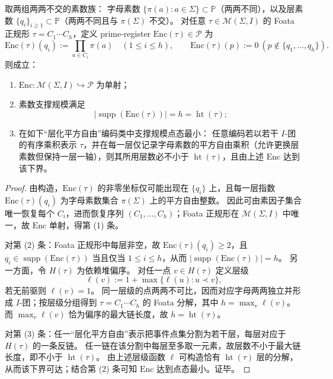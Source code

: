 \begin{theorem}\label{thm:conclusion-foata-godel-layer-encoding-min-support}
取两组两两不交的素数族：
字母素数 \(\{\pi(a):a\in\Sigma\}\subset\mathbb P\)（两两不同），以及层素数 \(\{q_i\}_{i\ge 1}\subset\mathbb P\)（两两不同且与 \(\pi(\Sigma)\) 不交）。
对任意 \(\tau\in\mathcal M(\Sigma,I)\) 的 Foata 正规形 \(\tau=C_1\cdots C_h\)，定义 prime-register
\(\mathrm{Enc}(\tau)\in\mathcal P\) 为
\[
\mathrm{Enc}(\tau)(q_i):=\prod_{a\in C_i}\pi(a)\quad(1\le i\le h),
\qquad
\mathrm{Enc}(\tau)(p):=0\ (p\notin\{q_1,\dots,q_h\}).
\]
则成立：
\begin{enumerate}
  \item \(\mathrm{Enc}:\mathcal M(\Sigma,I)\hookrightarrow\mathcal P\) 为单射；
  \item 素数支撑规模满足
  \[
  \bigl|\operatorname{supp}(\mathrm{Enc}(\tau))\bigr|=h=\operatorname{ht}(\tau);
  \]
  \item 在如下“层化平方自由”编码类中支撑规模点态最小：
  任意编码若以若干 \(I\)-团的有序乘积表示 \(\tau\)，并在每一层仅记录字母素数的平方自由乘积（允许更换层素数但保持一层一轴），则其所用层数必不小于 \(\operatorname{ht}(\tau)\)，且由上述 \(\mathrm{Enc}\) 达到该下界。
\end{enumerate}
\end{theorem}
\begin{proof}
由构造，\(\mathrm{Enc}(\tau)\) 的非零坐标仅可能出现在 \(\{q_i\}\) 上，且每一层指数 \(\mathrm{Enc}(\tau)(q_i)\) 为字母素数集合 \(\pi(\Sigma)\) 上的平方自由整数。
因此可由素因子集合唯一恢复每个 \(C_i\)，进而恢复序列 \((C_1,\dots,C_h)\)；Foata 正规形在 \(\mathcal M(\Sigma,I)\) 中唯一，故 \(\mathrm{Enc}\) 单射，得第 (1) 条。

对第 (2) 条：Foata 正规形中每层非空，故 \(\mathrm{Enc}(\tau)(q_i)\ge 2\)，且 \(q_i\in\operatorname{supp}(\mathrm{Enc}(\tau))\) 当且仅当 \(1\le i\le h\)，从而 \(|\operatorname{supp}(\mathrm{Enc}(\tau))|=h\)。
另一方面，令 \(H(\tau)\) 为依赖堆偏序。
对任一点 \(v\in H(\tau)\) 定义层级
\[
\ell(v):=1+\max\{\ell(u):u\prec v\},
\]
若无前驱则 \(\ell(v)=1\)。
同一层级的点两两不可比，因而对应字母两两独立并形成 \(I\)-团；按层级分组得到 \(\tau=C_1\cdots C_h\) 的 Foata 分解，其中 \(h=\max_v\ell(v)\)。
而 \(\max_v\ell(v)\) 恰为偏序的最大链长度，故 \(h=\operatorname{ht}(\tau)\)。

对第 (3) 条：任一“层化平方自由”表示把事件点集分割为若干层，每层对应于 \(H(\tau)\) 的一条反链。
任一链在该分割中每层至多取一元素，故层数不小于最大链长度，即不小于 \(\operatorname{ht}(\tau)\)。
由上述层级函数 \(\ell\) 可构造恰有 \(\operatorname{ht}(\tau)\) 层的分解，从而该下界可达；结合第 (2) 条可知 \(\mathrm{Enc}\) 达到点态最小。证毕。
\end{proof}

